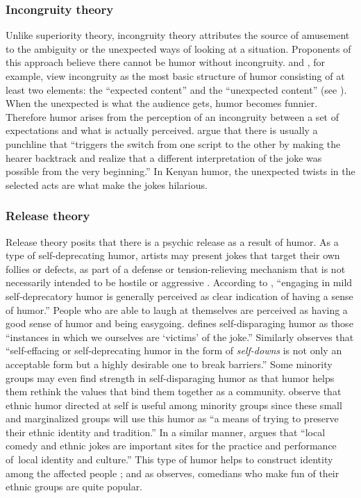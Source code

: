 \documentclass[output=paper]{langsci/langscibook}
\begin{document}
\subsubsection{Incongruity theory}

Unlike superiority theory, incongruity theory attributes the source of amusement to the ambiguity or the unexpected ways of looking at a situation. Proponents of this approach believe there cannot be humor without incongruity. \citet{Berk1999} and \citet{Carroll2014}, for example, view incongruity as the most basic structure of humor consisting of at least two elements: the “expected content” and the “unexpected content” (see \citealt[7]{Berk1999}). When the unexpected is what the audience gets, humor becomes funnier. Therefore humor arises from the perception of an incongruity between a set of expectations and what is actually perceived.  \citet[308]{AttardoRaskin1991} argue that there is usually a punchline that “triggers the switch from one script to the other by making the hearer backtrack and realize that a different interpretation of the joke was possible from the very beginning.” In Kenyan humor, the unexpected twists in the selected acts are what make the jokes hilarious. 

\subsubsection{Release theory}

Release theory posits that there is a psychic release as a result of humor. As a type of self-deprecating humor, artists may present jokes that target their own follies or defects, as part of a defense or tension-relieving mechanism that is not necessarily intended to be hostile or aggressive \citep{Davies1990,Gulas2006}. According to \citet[30]{Apte1987}, “engaging in mild self-deprecatory humor is generally perceived as clear indication of having a sense of humor.” People who are able to laugh at themselves are perceived as having a good sense of humor and being easygoing. \citet[x]{Ziv1988} defines self-disparaging humor as those “instances in which we ourselves are ‘victims’ of the joke.” Similarly \citet[12]{Berk1999} observes that “self-effacing or self-deprecating humor in the form of \textit{self-downs} is not only an acceptable form but a highly desirable one to break barriers.” Some minority groups may even find strength in self-disparaging humor as that humor helps them rethink the values that bind them together as a community. \citet[172]{GonzalesWiseman2005} observe that ethnic humor directed at self is useful among minority groups since these small and marginalized groups will use this humor as “a means of trying to preserve their ethnic identity and tradition.” In a similar manner, \citet[298]{Labrador2004} argues that ``local comedy and ethnic jokes are important sites for the practice and performance of~local identity and culture.” This type of humor helps to construct identity among the affected people \citep{Labrador2004,Rappoport2005}; and as \citet[36]{Apte1987} observes, comedians who make fun of their ethnic groups are quite popular. 
\end{document}

